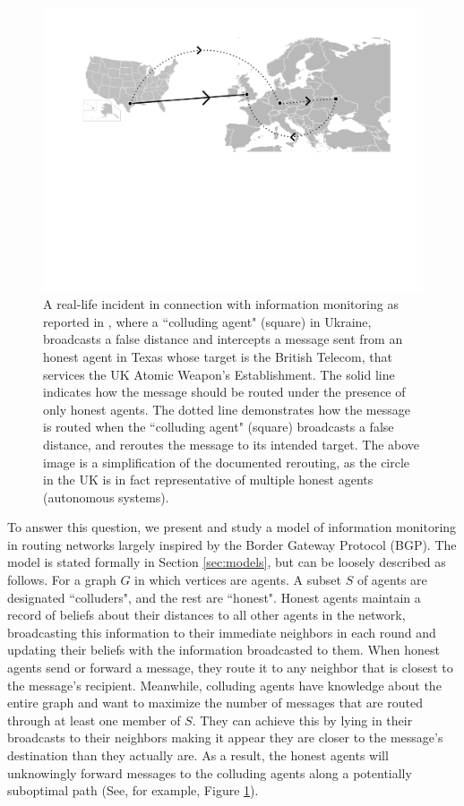 \documentclass[reprint]{revtex4-1}
\begin{document}
\begin{figure}
\centering
\includegraphics[width=1 \textwidth]{images/BGP4.pdf}
\caption{A real-life incident in connection with information monitoring as reported in \cite{Madory}, where a ``colluding agent" (square) in Ukraine, broadcasts a false distance and intercepts a message sent from an honest agent in Texas whose target is the British Telecom, that services the UK Atomic Weapon's Establishment. The solid line indicates how the message should be routed under the presence of only honest agents.  The dotted line demonstrates how the message is routed when the ``colluding agent" (square) broadcasts a false distance, and reroutes the message to its intended target.  The above image is a simplification of the documented rerouting, as the circle in the UK is in fact representative of multiple honest agents (autonomous systems).%
}
\label{fig:rerout}
\end{figure}


To answer this question, we present and study a model of information monitoring in routing networks largely inspired by the Border Gateway Protocol (BGP). The model is stated formally in Section \ref{sec:models}, but can be loosely described as follows. For a graph $G$ in which vertices are agents. A subset $S$ of agents are designated ``colluders", and the rest are ``honest". Honest agents maintain a record of beliefs about their distances to all other agents in the network, broadcasting this information to their immediate neighbors in each round and updating their beliefs with the information broadcasted to them. When honest agents send or forward a message, they route it to any neighbor that is closest to the message's recipient. Meanwhile, colluding agents have knowledge about the entire graph and want to maximize the number of messages that are routed through at least one member of $S$. They can achieve this by lying in their broadcasts to their neighbors making it appear they are closer to the message's destination than they actually are. As a result, the honest agents will unknowingly forward messages to the colluding agents along a potentially suboptimal path (See, for example, Figure \ref{fig:rerout}).
\end{document}
